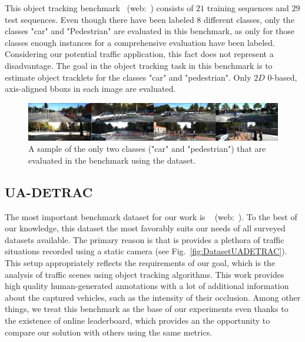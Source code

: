 This object tracking benchmark~\cite{Geiger2012CVPR} (web:~\cite{kittiobjecttrackingdataset}) consists of $21$ training sequences and $29$ test sequences. Even though there have been labeled $8$ different classes, only the classes "car" and "Pedestrian" are evaluated in this benchmark, as only for those classes enough instances for a comprehensive evaluation have been labeled. Considering our potential traffic application, this fact does not represent a disadvantage. The goal in the object tracking task in this benchmark is to estimate object tracklets for the classes "car" and "pedestrian". Only $2D$ $0$-based, axis-aligned \glspl{bbox} in each image are evaluated.

\begin{figure}[t]
    \centerline{\includegraphics[width=\linewidth]{figures/datasets/kitti_object_tracking_sample.jpg}}
    \caption[ dataset]{A sample of the only two classes ("car" and "pedestrian") that are evaluated in the benchmark using the  dataset. }
    \label{fig:DatasetKITTIObjectTracking}
\end{figure}

\subsection{UA-DETRAC}
\label{ssec:DatasetUADETRAC}

The most important benchmark dataset for our work is ~\cite{CVIU_UA-DETRAC} (web:~\cite{uadetracdataset}). To the best of our knowledge, this dataset the most favorably suits our needs of all surveyed datasets available. The primary reason is that is provides a plethora of traffic situations recorded using a static camera (see Fig.~\ref{fig:DatasetUADETRAC}). This setup appropriately reflects the requirements of our goal, which is the analysis of traffic scenes using object tracking algorithms. This work provides high quality human-generated annotations with a lot of additional information about the captured vehicles, such as the intensity of their occlusion. Among other things, we treat this benchmark as the base of our experiments even thanks to the existence of online leaderboard, which provides an the opportunity to compare our solution with others using the same metrics.

